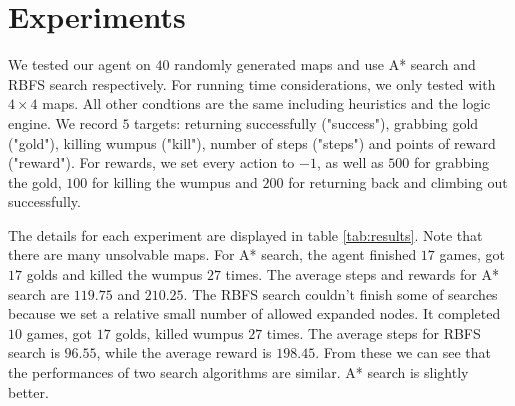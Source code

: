 \section{Experiments}\label{sec:exp}
We tested our agent on $40$ randomly generated maps and use A* search and RBFS search respectively. For running time considerations, we only tested with $4 \times 4$ maps. All other condtions are the same including heuristics and the logic engine. We record $5$ targets: returning successfully ("success"), grabbing gold ("gold"), killing wumpus ("kill"), number of steps ("steps") and points of reward ("reward"). For rewards, we set every action to $-1$,  as well as $500$ for grabbing the gold, $100$ for killing the wumpus and $200$ for returning back and climbing out successfully.

The details for each experiment are displayed in table \ref{tab:results}. Note that there are many unsolvable maps. For A* search, the agent finished $17$ games, got $17$ golds and killed the wumpus $27$ times. The average steps and rewards for A* search are $119.75$ and $210.25$. The RBFS search couldn't finish some of searches because we set a relative small number of allowed expanded nodes. It completed $10$ games, got $17$ golds, killed wumpus $27$ times. The average steps for RBFS search is $96.55$, while the average reward is $198.45$. From these we can see that the performances of two search algorithms are similar. A* search is slightly better.

